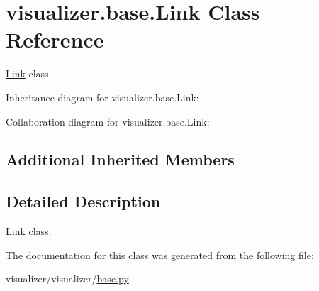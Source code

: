 \hypertarget{classvisualizer_1_1base_1_1Link}{}\section{visualizer.\+base.\+Link Class Reference}
\label{classvisualizer_1_1base_1_1Link}


\hyperlink{classvisualizer_1_1base_1_1Link}{Link} class.  




Inheritance diagram for visualizer.\+base.\+Link\+:


Collaboration diagram for visualizer.\+base.\+Link\+:
\subsection*{Additional Inherited Members}


\subsection{Detailed Description}
\hyperlink{classvisualizer_1_1base_1_1Link}{Link} class. 

The documentation for this class was generated from the following file\+:\begin{DoxyCompactItemize}
\item 
visualizer/visualizer/\hyperlink{base_8py}{base.\+py}\end{DoxyCompactItemize}
